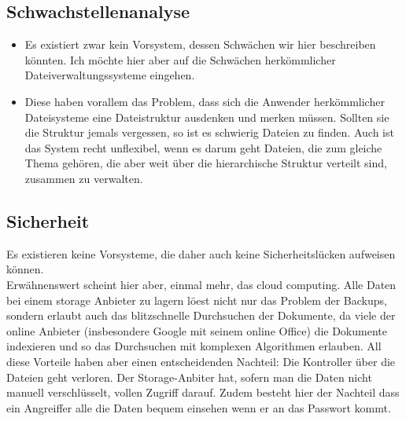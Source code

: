\documentclass[10pt,paper=a4,final]{scrartcl}
\begin{document}
\subsection{Schwachstellenanalyse}
\begin{itemize}
  \item Es existiert zwar kein Vorsystem, dessen Schwächen wir hier beschreiben könnten. Ich möchte hier aber auf die Schwächen herkömmlicher Dateiverwaltungssysteme eingehen.
  \item Diese haben vorallem das Problem, dass sich die Anwender herkömmlicher Dateisysteme eine Dateistruktur ausdenken und merken müssen. Sollten sie die Struktur jemals vergessen, so ist es schwierig Dateien zu finden. Auch ist das System recht unflexibel, wenn es darum geht Dateien, die zum gleiche Thema gehören, die aber weit über die hierarchische Struktur verteilt sind, zusammen zu verwalten.
\end{itemize}
\subsection{Sicherheit}
Es existieren keine Vorsysteme, die daher auch keine Sicherheitsl\"ucken aufweisen k\"onnen. \\
Erw\"ahnenswert scheint hier aber, einmal mehr, das cloud computing. Alle Daten bei einem storage Anbieter zu lagern l\"oest nicht nur das Problem der Backups, sondern erlaubt auch das blitzschnelle Durchsuchen der Dokumente, da viele der online Anbieter (insbesondere Google mit seinem online Office) die Dokumente indexieren und so das Durchsuchen mit komplexen Algorithmen erlauben. All diese Vorteile haben aber einen entscheidenden Nachteil: Die Kontroller \"uber die Dateien geht verloren. Der Storage-Anbiter hat, sofern man die Daten nicht manuell verschl\"usselt, vollen Zugriff darauf. Zudem besteht hier der Nachteil dass ein Angreiffer alle die Daten bequem einsehen wenn er an das Passwort kommt.
\end{document}
